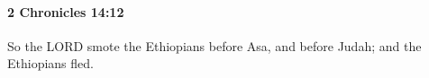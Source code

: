 
		\paragraph{2 Chronicles 14:12} %
			\label{2CHRONICLES-14-12}

			So the LORD smote the Ethiopians before Asa, and before Judah; and the Ethiopians fled.


